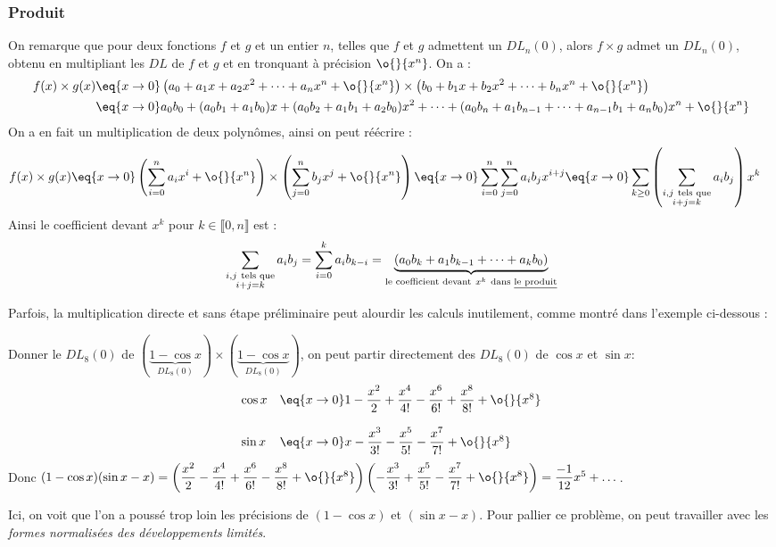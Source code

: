 \documentclass[a4paper,french,bookmarks]{article}
\begin{document}
\subsubsection{Produit}

On remarque que pour deux fonctions $f$ et $g$ et un entier $n$, telles que $f$ et $g$ admettent un $DL_n(0)$, alors $f \times g$ admet un $DL_n(0)$, obtenu en multipliant les $DL$ de $f$ et $g$ et en tronquant à précision $\o{}{x^n}$. On a :
\begin{align*}
    f(x) \times g(x) &\eq{x \to 0} \left(a_0+a_1x+a_2x^2 + \dots + a_nx^n + \o{}{x^n}\right)\times\left(b_0+b_1x+b_2x^2+\dots+b_nx^n + \o{}{x^n}\right)\\
    &\eq{x \to 0} a_0b_0 + (a_0b_1 + a_1b_0)x + (a_0b_2+a_1b_1+a_2b_0)x^2 + \dots + (a_0b_n + a_1b_{n-1} + \dots + a_{n-1}b_1 + a_nb_0)x^n + \o{}{x^n}
\end{align*} 
On a en fait un multiplication de deux polynômes, ainsi on peut réécrire :
\begin{align*}
    f(x) \times g(x) &\eq{x \to 0} \left(\sum_{i=0}^n a_ix^i + \o{}{x^n }\right)\times\left(\sum_{j=0}^n b_jx^j + \o{}{x^n }\right)
    \eq{x \to 0} \sum_{i=0}^n \sum_{j=0}^n a_ib_jx^{i+j}\eq{x \to 0} \sum_{k\geq0}\left(\sum_{\substack{i, j \ \text{tels que}\\i+j=k}}a_ib_j\right)x^k
\end{align*} 
Ainsi le coefficient devant $x^k$ pour $k \in \llbracket0, n\rrbracket$ est :
\[\sum_{\substack{i, j \ \text{tels que}\\i+j=k}} a_ib_j = \sum_{i=0}^k a_ib_{k-i}=\underbrace{(a_0b_k + a_1b_{k-1}+\dots+a_kb_0)}_{\text{le coefficient devant} \ x^k \ \text{dans \underline{le produit}}}\]

Parfois, la multiplication directe et sans étape préliminaire peut alourdir les calculs inutilement, comme montré dans l'exemple ci-dessous :
\begin{example}{}{}
    Donner le $DL_8(0)$ de $(\underbrace{1-\cos x}_{DL_8(0)})\times(\underbrace{1-\cos x}_{DL_8(0)})$, on peut partir directement des $DL_8(0)$ de $\cos x$ et $\sin x $:
    \[ \begin{array}{ll}
        \cos x &\eq{x \to 0} 1 - \dfrac{x^2}{2} + \dfrac{x^4}{4!} - \dfrac{x^6}{6!} + \dfrac{x^8}{8!} + \o{}{x^8}\\
        \\
        \sin x &\eq{x \to 0} x - \dfrac{x^3}{3!}- \dfrac{x^5}{5!} - \dfrac{x^7}{7!} + \o{}{x^8}
    \end{array}\]
    Donc $(1-\cos x)(\sin x - x) = \left(\dfrac{x^2}{2} - \dfrac{x^4}{4!} + \dfrac{x^6}{6!} - \dfrac{x^8}{8!} + \o{}{x^8}\right)\left(- \dfrac{x^3}{3!} +  \dfrac{x^5}{5!} - \dfrac{x^7}{7!} + \o{}{x^8}\right)=\dfrac{-1}{12}x^5 + \dots$.

\end{example}
    Ici, on voit que l'on a poussé trop loin les précisions de $(1-\cos x)$ et $(\sin x -x)$. Pour pallier ce problème, on peut travailler avec les \textit{formes normalisées des développements limités}.
    
\end{document}
